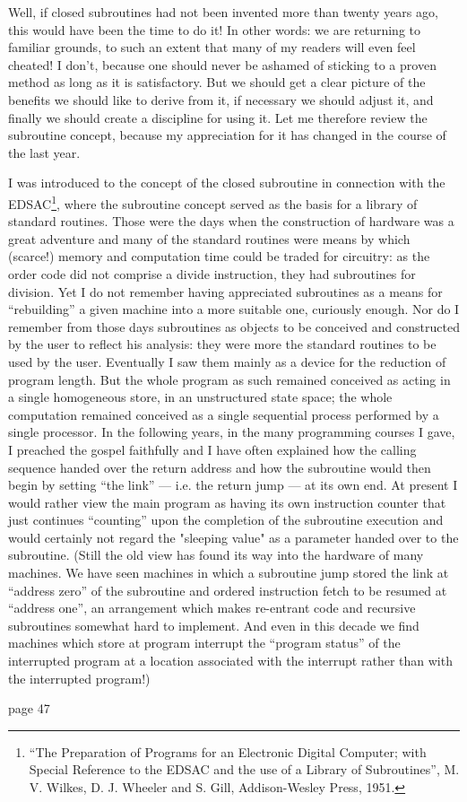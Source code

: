 Well, if closed subroutines had not been invented more than twenty years ago, this would have been the time to do it! In other words: we are returning to familiar grounds, to such an extent that many of my readers will even feel cheated! I don't, because one should never be ashamed of sticking to a proven method as long as it is satisfactory. But we should get a clear picture of the benefits we should like to derive from it, if necessary we should adjust it, and finally we should create a discipline for using it. Let me therefore review the subroutine concept, because my appreciation for it has changed in the course of the last year.

I was introduced to the concept of the closed subroutine in connection with the EDSAC\footnote{``The Preparation of Programs for an Electronic Digital Computer; with Special Reference to the EDSAC and the use of a Library of Subroutines'', M. V. Wilkes, D. J. Wheeler and S. Gill, Addison-Wesley Press, 1951.}, where the subroutine concept served as the basis for a library of standard routines. Those were the days when the construction of hardware was a great adventure and many of the standard routines were means by which (scarce!) memory and computation time could be traded for circuitry: as the order code did not comprise a divide instruction, they had subroutines for division. Yet I do not remember having appreciated subroutines as a means for ``rebuilding'' a given machine into a more suitable one, curiously enough. Nor do I remember from those days subroutines as objects to be conceived and constructed by the user to reflect his analysis: they were more the standard routines to be used by the user. Eventually I saw them mainly as a device for the reduction of program length. But the whole program as such remained conceived as acting in a single homogeneous store, in an unstructured state space; the whole computation remained conceived as a single sequential process performed by a single processor. In the following years, in the many programming courses I gave, I preached the gospel faithfully and I have often explained how the calling sequence handed over the return address and how the subroutine would then begin by setting ``the link'' --- i.e. the return jump --- at its own end. At present I would rather view the main program as having its own instruction counter that just continues ``counting'' upon the completion of the subroutine execution and would certainly not regard the "sleeping value" as a parameter handed over to the subroutine. (Still the old view has found its way into the hardware of many machines. We have seen machines in which a subroutine jump stored the link at ``address zero'' of the subroutine and ordered instruction fetch to be resumed at ``address one'', an arrangement which makes re-entrant code and recursive subroutines somewhat hard to implement. And even in this decade we find machines which store at program interrupt the ``program status'' of the interrupted program at a location associated with the interrupt rather than with the interrupted program!)

page 47